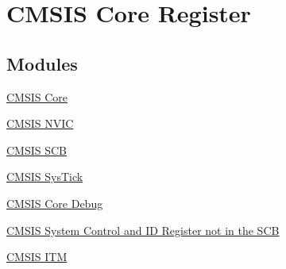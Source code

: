 \hypertarget{group___c_m_s_i_s__core__register}{\section{C\-M\-S\-I\-S Core Register}
\label{group___c_m_s_i_s__core__register}
}
\subsection*{Modules}
\begin{DoxyCompactItemize}
\item 
\hyperlink{group___c_m_s_i_s___c_o_r_e}{C\-M\-S\-I\-S Core}
\item 
\hyperlink{group___c_m_s_i_s___n_v_i_c}{C\-M\-S\-I\-S N\-V\-I\-C}
\item 
\hyperlink{group___c_m_s_i_s___s_c_b}{C\-M\-S\-I\-S S\-C\-B}
\item 
\hyperlink{group___c_m_s_i_s___sys_tick}{C\-M\-S\-I\-S Sys\-Tick}
\item 
\hyperlink{group___c_m_s_i_s___core_debug}{C\-M\-S\-I\-S Core Debug}
\item 
\hyperlink{group___c_m_s_i_s___s_cn_s_c_b}{C\-M\-S\-I\-S System Control and I\-D Register not in the S\-C\-B}
\item 
\hyperlink{group___c_m_s_i_s___i_t_m}{C\-M\-S\-I\-S I\-T\-M}
\end{DoxyCompactItemize}
